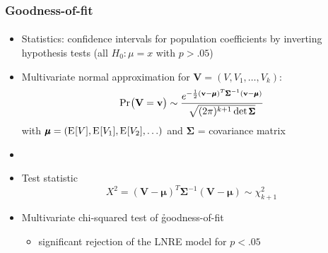 \documentclass[t]{beamer} %
\begin{document}
\begin{frame}
  \frametitle{Goodness-of-fit}
  \framesubtitle{\citep[Sec.~3.3]{Baayen:01}}

  \begin{itemize}
  \item Statistics: confidence intervals for population coefficients by inverting hypothesis tests (all $H_0: \mu = x$ with $p > .05$)
  \item<2-> Multivariate normal approximation for $\mathbf{V} = (V, V_1, \ldots, V_k)$:
    \[
      \mathop{\mathrm{Pr}_{}}\bigl(\mathbf{V} = \mathbf{v}\bigr) \sim
      \frac{
        e^{-\frac12 (\mathbf{v} - \pmb{\mu})^T \pmb{\Sigma}^{-1} (\mathbf{v} - \pmb{\mu})}
      }{\small
        \sqrt{(2\pi)^{k+1} \det \pmb{\Sigma}}
      }
    \]
    with $\pmb{\mu} = (\mathrm{E}_{}[V], \mathrm{E}_{}[V_1], \mathrm{E}_{}[V_2], \ldots)$ and $\pmb{\Sigma}$ = covariance matrix
  \item[]
  \item<3-> Test statistic
    \[
      X^2 = (\mathbf{V} - \pmb{\mu})^T \pmb{\Sigma}^{-1} (\mathbf{V} - \pmb{\mu}) \sim \chi^2_{k + 1}
    \]
  \item<3->[\So] Multivariate chi-squared test of \h{goodness-of-fit}
    \begin{itemize}
    \item[\hand] significant rejection of the LNRE model for $p < .05$
    \end{itemize}
  \end{itemize}
\end{frame}
\end{document}
